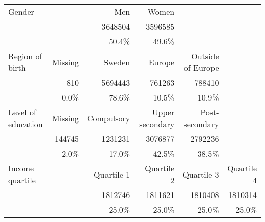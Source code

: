 \begin{tabular}{@{}l*{5}{r}@{}}
\toprule
Gender             &              & {Men}         & {Women}           &                     & \tabularnewline
                   &              & \num{3648504} & \num{3596585}     &                     & \tabularnewline
                   &              & 50.4\%        & 49.6\%            &                     & \tabularnewline
\midrule
Region of birth    & {Missing}    & {Sweden}      & {Europe}          & {Outside of Europe} & \tabularnewline
                   & \num{810}    & \num{5694443} & \num{761263}      & \num{788410}        & \tabularnewline
                   & 0.0\%        & 78.6\%        & 10.5\%            & 10.9\%              & \tabularnewline
\midrule
Level of education & {Missing}    & {Compulsory}  & {Upper secondary} & {Post-secondary}    & \tabularnewline
                   & \num{144745} & \num{1231231} & \num{3076877}     & \num{2792236}       & \tabularnewline
                   & 2.0\%        & 17.0\%        & 42.5\%            & 38.5\%              & \tabularnewline
\midrule
Income quartile    &              & {Quartile 1}  & {Quartile 2}      & {Quartile 3}        & {Quartile 4}  \tabularnewline
                   &              & \num{1812746} & \num{1811621}     & \num{1810408}       & \num{1810314} \tabularnewline
                   &              & 25.0\%        & 25.0\%            & 25.0\%              & 25.0\%        \tabularnewline
\bottomrule
\end{tabular}